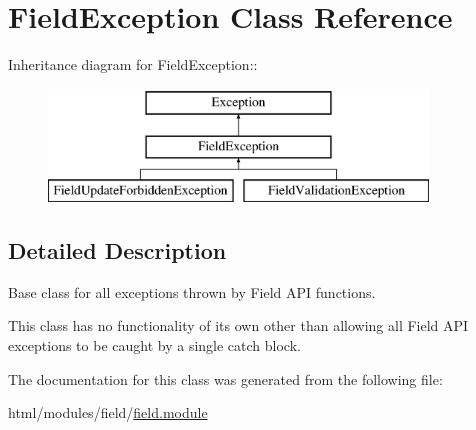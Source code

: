 \hypertarget{classFieldException}{
\section{FieldException Class Reference}
\label{classFieldException}
}
Inheritance diagram for FieldException::\begin{figure}[H]
\begin{center}
\leavevmode
\includegraphics[height=3cm]{classFieldException}
\end{center}
\end{figure}


\subsection{Detailed Description}
Base class for all exceptions thrown by Field API functions.

This class has no functionality of its own other than allowing all Field API exceptions to be caught by a single catch block. 

The documentation for this class was generated from the following file:\begin{DoxyCompactItemize}
\item 
html/modules/field/\hyperlink{field_8module}{field.module}\end{DoxyCompactItemize}
